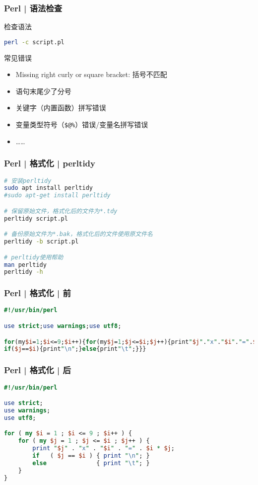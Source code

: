 \begin{frame}[fragile]
  \frametitle{Perl | 语法检查}
  \begin{block}{\alert{检查语法}}
\begin{lstlisting}[language=bash]
perl -c script.pl
\end{lstlisting}
  \end{block}
  \pause
  \begin{block}{常见错误}
    \begin{itemize}
      \item Missing right curly or square bracket: 括号不匹配
      \item 语句末尾少了分号
      \item 关键字（内置函数）拼写错误
      \item 变量类型符号（\verb|$@%|）错误/变量名拼写错误
      \item ……
    \end{itemize}
  \end{block}
\end{frame}

\begin{frame}[fragile]
  \frametitle{Perl | 格式化 | \alert{perltidy}}
  \vspace{-1.5em}
\begin{lstlisting}[language=bash]
# 安装perltidy
sudo apt install perltidy
#sudo apt-get install perltidy

# 保留原始文件，格式化后的文件为*.tdy
perltidy script.pl

# 备份原始文件为*.bak，格式化后的文件使用原文件名
perltidy -b script.pl

# perltidy使用帮助
man perltidy
perltidy -h
\end{lstlisting} 
\end{frame}

\begin{frame}[fragile]
  \frametitle{Perl | 格式化 | 前}
  \vspace{-1.5em}
\begin{lstlisting}[language=Perl]
#!/usr/bin/perl 

use strict;use warnings;use utf8;

for(my$i=1;$i<=9;$i++){for(my$j=1;$j<=$i;$j++){print"$j"."x"."$i"."=".$i*$j;
if($j==$i){print"\n";}else{print"\t";}}}
\end{lstlisting} 
\end{frame}

\begin{frame}[fragile]
  \frametitle{Perl | 格式化 | \alert{后}}
  \vspace{-1.5em}
\begin{lstlisting}[language=Perl,basicstyle=\small\tt]
#!/usr/bin/perl 

use strict;
use warnings;
use utf8;

for ( my $i = 1 ; $i <= 9 ; $i++ ) {
    for ( my $j = 1 ; $j <= $i ; $j++ ) {
        print "$j" . "x" . "$i" . "=" . $i * $j;
        if   ( $j == $i ) { print "\n"; }
        else              { print "\t"; }
    }
}
\end{lstlisting} 
\end{frame}

